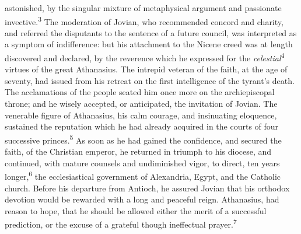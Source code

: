 astonished, by the singular mixture of metaphysical argument and
passionate invective.\textsuperscript{3} The moderation of Jovian, who recommended
concord and charity, and referred the disputants to the sentence
of a future council, was interpreted as a symptom of
indifference: but his attachment to the Nicene creed was at
length discovered and declared, by the reverence which he
expressed for the \textit{celestial}\textsuperscript{4} virtues of the great Athanasius.
The intrepid veteran of the faith, at the age of seventy, had
issued from his retreat on the first intelligence of the tyrant’s
death. The acclamations of the people seated him once more on the
archiepiscopal throne; and he wisely accepted, or anticipated,
the invitation of Jovian. The venerable figure of Athanasius, his
calm courage, and insinuating eloquence, sustained the reputation
which he had already acquired in the courts of four successive
princes.\textsuperscript{5} As soon as he had gained the confidence, and secured
the faith, of the Christian emperor, he returned in triumph to
his diocese, and continued, with mature counsels and undiminished
vigor, to direct, ten years longer,\textsuperscript{6} the ecclesiastical
government of Alexandria, Egypt, and the Catholic church. Before
his departure from Antioch, he assured Jovian that his orthodox
devotion would be rewarded with a long and peaceful reign.
Athanasius, had reason to hope, that he should be allowed either
the merit of a successful prediction, or the excuse of a grateful
though ineffectual prayer.\textsuperscript{7}

